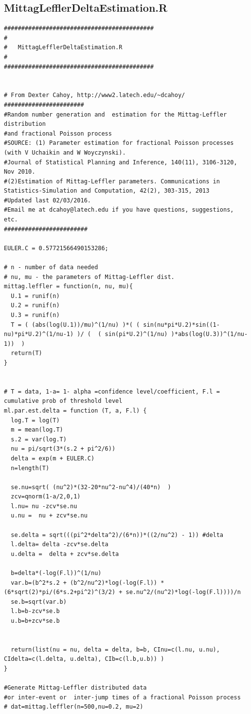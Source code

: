 \documentclass[honours,12pt,twoside, openright]{unswthesis}
\newcommand{\1}{\mathbf 1}
\numberwithin{equation}{section}
\theoremstyle{definition}
\theoremstyle{remark}
\begin{document}
\begin{appendices}
\section{MittagLefflerDeltaEstimation.R}
\begin{lstlisting}
###########################################
#
#	MittagLefflerDeltaEstimation.R
#
###########################################


# From Dexter Cahoy, http://www2.latech.edu/~dcahoy/
#######################
#Random number generation and  estimation for the Mittag-Leffler distribution  
#and fractional Poisson process
#SOURCE: (1) Parameter estimation for fractional Poisson processes (with V Uchaikin and W Woyczynski). 
#Journal of Statistical Planning and Inference, 140(11), 3106-3120, Nov 2010.
#(2)Estimation of Mittag-Leffler parameters. Communications in Statistics-Simulation and Computation, 42(2), 303-315, 2013
#Updated last 02/03/2016.
#Email me at dcahoy@latech.edu if you have questions, suggestions, etc.
########################

EULER.C = 0.57721566490153286;

# n - number of data needed
# nu, mu - the parameters of Mittag-Leffler dist.
mittag.leffler = function(n, nu, mu){
  U.1 = runif(n)
  U.2 = runif(n)
  U.3 = runif(n)
  T = ( (abs(log(U.1))/mu)^(1/nu) )*( ( sin(nu*pi*U.2)*sin((1-nu)*pi*U.2)^(1/nu-1) )/ (  ( sin(pi*U.2)^(1/nu) )*abs(log(U.3))^(1/nu-1))  )
  return(T)
}


# T = data, 1-a= 1- alpha =confidence level/coefficient, F.l = cumulative prob of threshold level
ml.par.est.delta = function (T, a, F.l) {
  log.T = log(T)
  m = mean(log.T)
  s.2 = var(log.T)
  nu = pi/sqrt(3*(s.2 + pi^2/6))
  delta = exp(m + EULER.C)
  n=length(T)
  
  se.nu=sqrt( (nu^2)*(32-20*nu^2-nu^4)/(40*n)  )
  zcv=qnorm(1-a/2,0,1)  
  l.nu= nu -zcv*se.nu
  u.nu =  nu + zcv*se.nu
  
  se.delta = sqrt(((pi^2*delta^2)/(6*n))*((2/nu^2) - 1)) #delta
  l.delta= delta -zcv*se.delta
  u.delta =  delta + zcv*se.delta
  
  b=delta*(-log(F.l))^(1/nu)
  var.b=(b^2*s.2 + (b^2/nu^2)*log(-log(F.l)) * (6*sqrt(2)*pi/(6*s.2+pi^2)^(3/2) + se.nu^2/(nu^2)*log(-log(F.l))))/n
  se.b=sqrt(var.b)
  l.b=b-zcv*se.b
  u.b=b+zcv*se.b
  
  
  return(list(nu = nu, delta = delta, b=b, CInu=c(l.nu, u.nu), CIdelta=c(l.delta, u.delta), CIb=c(l.b,u.b)) )      
}

#Generate Mittag-Leffler distributed data 
#or inter-event or  inter-jump times of a fractional Poisson process
# dat=mittag.leffler(n=500,nu=0.2, mu=2)


\end{lstlisting}
\end{appendices}
\end{document}
